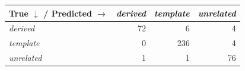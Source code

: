 \begin{tabular}{lrrr}
\toprule
True $\downarrow$ / Predicted $\rightarrow$ & \textit{derived} & \textit{template} & \textit{unrelated} \\
\midrule
\textit{derived} & 72 & 6 & 4 \\
\textit{template} & 0 & 236 & 4 \\
\textit{unrelated} & 1 & 1 & 76 \\
\bottomrule
\end{tabular}
